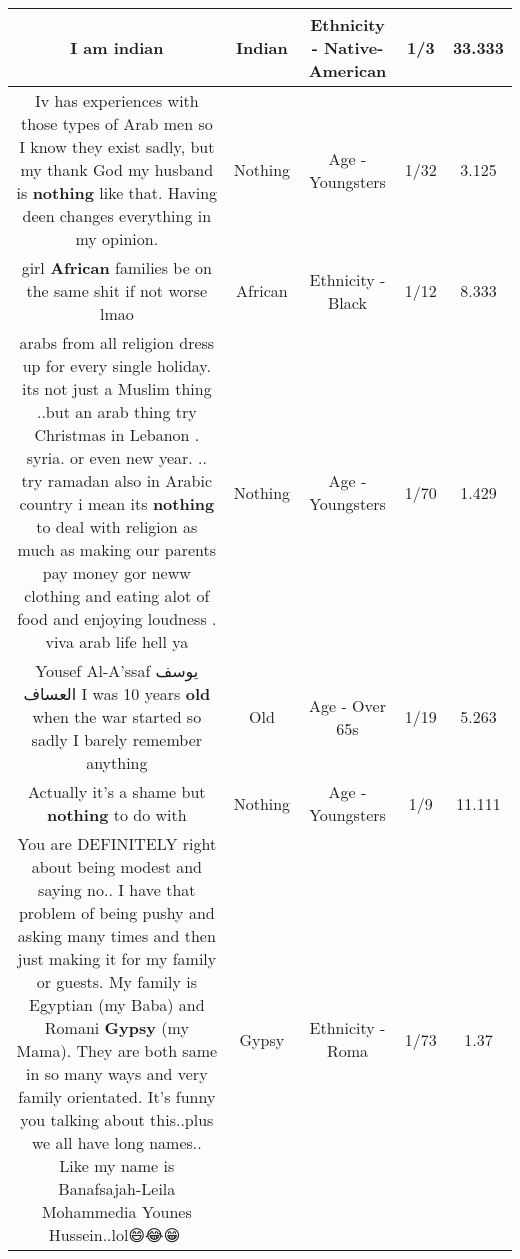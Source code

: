\documentclass[11pt]{article}
\newlength\mylength
\begin{document}
\begin{center}
\begin{longtable}{|C{.65\mylength}|C{.30\mylength}|C{.12\mylength}|C{.12\mylength}|C{.12\mylength}|}
  \small I am indian\normalsize   & Indian & Ethnicity - Native-American & 1/3 & 33.333 \\  \hline
  \small Iv has experiences with those types of Arab men so I know they exist sadly, but my thank God my husband is \textbf{nothing} like that. Having deen changes everything in my opinion.\normalsize   & Nothing & Age - Youngsters & 1/32 & 3.125 \\  \hline
  \small girl \textbf{African} families be on the same shit if not worse lmao\normalsize   & African & Ethnicity - Black & 1/12 & 8.333 \\  \hline
  \small arabs from all religion dress up for every single holiday. its not just a Muslim  thing ..but an arab thing try Christmas in Lebanon . syria. or even  new year. ..  try ramadan also in Arabic  country  i mean its \textbf{nothing} to deal with religion  as much as making our parents pay money gor neww clothing and eating alot of food and enjoying loudness  .  viva arab life  hell ya\normalsize   & Nothing & Age - Youngsters & 1/70 & 1.429 \\  \hline
  \small Yousef Al-A'ssaf يوسف العساف I was 10 years \textbf{old} when the war started so sadly I barely remember anything\normalsize   & Old & Age - Over 65s & 1/19 & 5.263 \\  \hline
  \small Actually it's a shame but \textbf{nothing} to do with\normalsize   & Nothing & Age - Youngsters & 1/9 & 11.111 \\  \hline
  \small You are DEFINITELY right about being modest and saying no.. I have that problem of being pushy and asking many times and then just making it for my family or guests. My family is Egyptian (my Baba) and Romani \textbf{Gypsy} (my Mama). They are both same in so many ways and very family orientated. It's funny you talking about this..plus we all have long names.. Like my name is Banafsajah-Leila Mohammedia Younes Hussein..lol😄😂😁💋\normalsize   & Gypsy & Ethnicity - Roma & 1/73 & 1.37 \\  \hline

\end{longtable}
\end{center}
\end{document}
